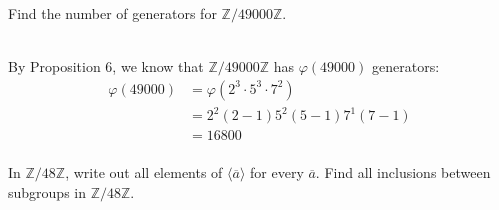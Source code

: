 \begin{exercise}
    Find the number of generators for $\mathbb{Z}/49000\mathbb{Z}$.\\
\end{exercise}

\begin{solution}
    \\By Proposition $6$, we know that $\mathbb{Z}/49000\mathbb{Z}$ has
    $\varphi(49000)$ generators:
    \begin{align*}
        \varphi(49000) &= \varphi(2^3\cdot 5^3\cdot 7^2) \\
        &= 2^2(2-1)5^2(5-1)7^1(7-1)\\
        &= 16800\\
    \end{align*}
\end{solution}

\begin{exercise}
    In $\mathbb{Z}/48\mathbb{Z}$, write out all elements of $\langle
    \overline{a}\rangle$ for every $\overline{a}$. Find all inclusions
    between subgroups in $\mathbb{Z}/48\mathbb{Z}$.\\
\end{exercise}

